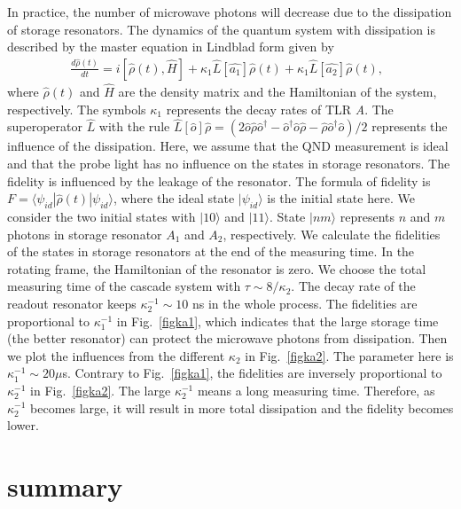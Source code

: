 \documentclass[showpacs,aps,graphicx,twocolumn]{revtex4}
\begin{document}
In practice, the number of microwave photons will decrease due to
the dissipation of storage resonators. The dynamics of the quantum system with
dissipation is described by the master equation in Lindblad form
given by
\begin{eqnarray}        \label{eq20}
\frac{d\hat{\rho}(t)}{dt}\!=\!i\left[\hat{\rho}(t),\hat{H}\right]\!
+\!\kappa_{1}\hat{L}\left[\hat{a_{1}}\right]\hat{\rho}(t)
\!+\!\kappa_{1}\hat{L}\left[\hat{a_{2}}\right]\hat{\rho}(t),\;\;
\end{eqnarray}
where $\hat{\rho}(t)$ and $\hat{H}$ are the density matrix and
the Hamiltonian of the system, respectively. The symbols
$\kappa_{1}$ represents the decay rates of TLR
\emph{A}. The superoperator $\hat{L}$ with the rule
$\hat{L}[\hat{o}]\hat{\rho}=(2\hat{o}\hat{\rho}\hat{o}^{\dag}
-\hat{o}^{\dag}\hat{o}\hat{\rho}-\hat{\rho}\hat{o}^{\dag}\hat{o})/2$
represents the influence of the dissipation.
Here, we assume that the QND measurement is ideal and that the probe light has no influence on the states in storage resonators. The fidelity is influenced by the leakage of
the resonator. The formula of fidelity is $F=\langle\psi_{id}|\hat{\rho}(t)|\psi_{id}\rangle$,
where the ideal state $|\psi_{id}\rangle$ is the initial state here. We consider the two initial states with $|10\rangle$ and $|11\rangle$. State $|nm\rangle$ represents $n$ and $m$ photons in storage resonator $A_{1}$ and $A_{2}$, respectively.
We calculate the fidelities of the states in storage resonators at the end of the measuring time. In the rotating frame, the Hamiltonian of the resonator is zero. We choose the total measuring time of the cascade system with $\tau\sim 8/\kappa_{2}$.
The decay rate of the readout resonator keeps
$\kappa_{2}^{-1}\sim 10$ ns in the whole process. The fidelities are
proportional to $\kappa_{1}^{-1}$ in Fig.~\ref{figka1}, which
indicates that the large storage time (the better resonator) can
protect the microwave photons from dissipation. Then we plot the influences from
the different $\kappa_{2}$ in Fig.~\ref{figka2}. The parameter here is $\kappa_{1}^{-1}\sim20 \mu$s.
Contrary to Fig.~\ref{figka1}, the fidelities are inversely proportional to
$\kappa_{2}^{-1}$ in Fig.~\ref{figka2}. The large $\kappa_{2}^{-1}$
means a long measuring time. Therefore, as  $\kappa_{2}^{-1}$
becomes large, it will result in more total dissipation and the
fidelity becomes lower.






\section{summary}
\label{sec4}
\end{document}
